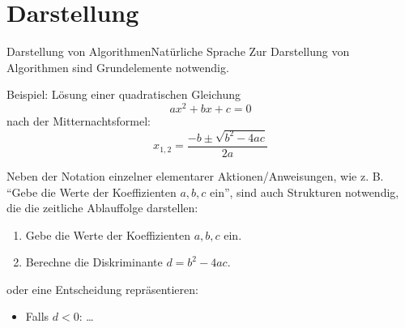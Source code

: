 \documentclass[xelatex,aspectratio=169]{beamer}
\begin{document}
\section{Darstellung}

\begin{frame}{Darstellung von Algorithmen}{Natürliche Sprache}
  Zur Darstellung von Algorithmen sind Grundelemente notwendig.
  \begin{exampleblock}{Beispiel: Lösung einer quadratischen Gleichung}
    \[ a x^2 + b x + c = 0 \]
    nach der Mitternachtsformel:
    \[ x_{1,2} = \frac{-b \pm \sqrt{b^2 - 4ac}}{2a} \]
  \end{exampleblock}

  Neben der Notation einzelner elementarer Aktionen/Anweisungen, wie z. B. \enquote{Gebe die Werte der Koeffizienten $a, b, c$ ein}, sind auch Strukturen notwendig, die die zeitliche Ablauffolge darstellen:
  \begin{enumerate}
    \item Gebe die Werte der Koeffizienten $a, b, c$ ein.
    \item Berechne die Diskriminante $d = b^2 - 4ac$.
  \end{enumerate}
  oder eine Entscheidung repräsentieren:
  \begin{itemize}
    \item Falls $d < 0$: \ldots
  \end{itemize}
\end{frame}
\end{document}
